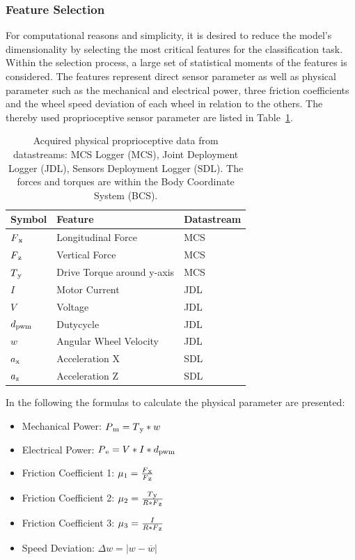 \documentclass{article}
\begin{document}
\subsubsection{Feature Selection}
For computational reasons and simplicity, it is desired to reduce the model's dimensionality by selecting the most critical features for the  classification task. 
Within the selection process, a large set of statistical moments of the features is considered. The features represent direct sensor parameter as well as physical parameter such as the mechanical and electrical power, three friction coefficients and the wheel speed deviation of each wheel in relation to the others. The thereby used proprioceptive sensor parameter are listed in Table~\ref{fig:features1}.
\begin{table}[htb!]
   \centering
    \caption{Acquired physical proprioceptive data from datastreams: MCS Logger (MCS), Joint Deployment Logger (JDL), Sensors Deployment Logger (SDL). The forces and torques are within the Body Coordinate System (BCS).\cite{Dimastrogiovanni2020}\label{fig:features1}}
    \begin{tabularx}{\columnwidth}{XXX}
    \textbf{Symbol}& \textbf{Feature} & \textbf{Datastream}  \\
    \hline
      $F\textsubscript{x}$ & Longitudinal Force	 &  MCS\\
      $F\textsubscript{z}$& Vertical Force	 &MCS \\ 
      $T\textsubscript{y}$& Drive Torque around y-axis	   &MCS\\ 
      $I $& Motor Current	  & JDL\\ 
      $V$ & Voltage 	   &JDL\\ 
      $d\textsubscript{pwm}$&  Dutycycle	   &JDL\\ 
      $w$& Angular Wheel Velocity 	 &JDL \\
      $a\textsubscript{x}$& Acceleration X	  &SDL\\ 
      $a\textsubscript{z}$&  Acceleration Z	   &SDL\\ 
    \end{tabularx}	
\end{table}
 In the following the formulas to calculate the physical parameter are presented:
\begin{itemize}
\item Mechanical Power: $ P\textsubscript{m} = T\textsubscript{y} * w $
\item Electrical Power: $ P\textsubscript{e} = V* I * d\textsubscript{pwm}$
\item Friction Coefficient 1: $\mu \textsubscript{1} = \frac{F\textsubscript{x}}{F\textsubscript{z}} $
\item Friction Coefficient 2: $\mu \textsubscript{2} = \frac{T\textsubscript{y}}{R * F\textsubscript{z}}$ 
\item Friction Coefficient 3: $\mu \textsubscript{3} = \frac{I}{R * F\textsubscript{z}}$
\item Speed Deviation:	 $\Delta w = |w-\overline{w}| $
\end{itemize}
\end{document}
